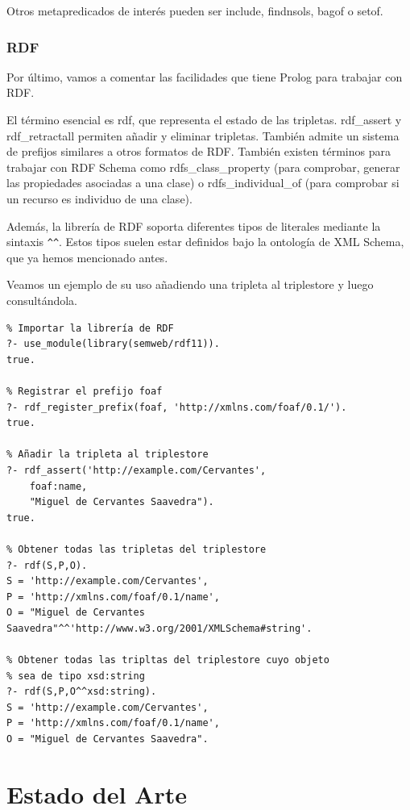 \documentclass[openright,twoside,12pt]{book}
\begin{document}
Otros metapredicados de interés pueden ser include, findnsols, bagof o setof.

\subsection{RDF}

Por último, vamos a comentar las facilidades que tiene Prolog para trabajar con RDF.

El término esencial es rdf, que representa el estado de las tripletas. rdf\_assert y rdf\_retractall permiten añadir y eliminar tripletas. También admite un sistema de prefijos similares a otros formatos de RDF. También existen términos para trabajar con RDF Schema como rdfs\_class\_property (para comprobar, generar las propiedades asociadas a una clase) o rdfs\_individual\_of (para comprobar si un recurso es individuo de una clase).

Además, la librería de RDF soporta diferentes tipos de literales mediante la sintaxis \verb|^^|. Estos tipos suelen estar definidos bajo la ontología de XML Schema, que ya hemos mencionado antes.

Veamos un ejemplo de su uso añadiendo una tripleta al triplestore y luego consultándola.

\begin{lstlisting}
% Importar la librería de RDF
?- use_module(library(semweb/rdf11)).
true.

% Registrar el prefijo foaf
?- rdf_register_prefix(foaf, 'http://xmlns.com/foaf/0.1/').
true.

% Añadir la tripleta al triplestore
?- rdf_assert('http://example.com/Cervantes', 
    foaf:name, 
    "Miguel de Cervantes Saavedra").
true.

% Obtener todas las tripletas del triplestore
?- rdf(S,P,O).
S = 'http://example.com/Cervantes',
P = 'http://xmlns.com/foaf/0.1/name',
O = "Miguel de Cervantes Saavedra"^^'http://www.w3.org/2001/XMLSchema#string'.

% Obtener todas las tripltas del triplestore cuyo objeto
% sea de tipo xsd:string
?- rdf(S,P,O^^xsd:string).
S = 'http://example.com/Cervantes',
P = 'http://xmlns.com/foaf/0.1/name',
O = "Miguel de Cervantes Saavedra".
\end{lstlisting}


\chapter{Estado del Arte}
\end{document}
